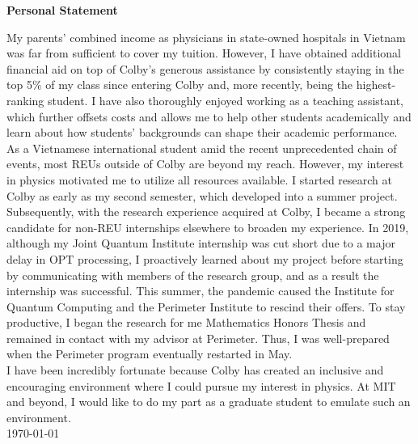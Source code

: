 \documentclass[12pt]{article}
\begin{document}
\begin{center}
	\textbf{Personal Statement}
\end{center}
My parents' combined income as physicians in state-owned hospitals in Vietnam was far from sufficient to cover my tuition. However,  I have obtained additional financial aid on top of Colby's generous assistance by consistently staying in the top 5\% of my class since entering Colby and, more recently, being the highest-ranking student. I have also thoroughly enjoyed working as a teaching assistant, which further offsets costs and allows me to help other students academically and learn about how students' backgrounds can shape their academic performance. \\

As a Vietnamese international student amid the recent unprecedented chain of events, most REUs outside of Colby are beyond my reach. However, my interest in physics motivated me to utilize all resources available. I started research at Colby as early as my second semester, which developed into a summer project. Subsequently, with the research experience acquired at Colby, I became a strong candidate for non-REU internships elsewhere to broaden my experience. In 2019, although my Joint Quantum Institute internship was cut short due to a major delay in OPT processing, I proactively learned about my project before starting by communicating with members of the research group, and as a result the internship was successful. This summer, the pandemic caused the Institute for Quantum Computing and the Perimeter Institute to rescind their offers. To stay productive, I began the research for me Mathematics Honors Thesis and remained in contact with my advisor at Perimeter. Thus, I was well-prepared when the Perimeter program eventually restarted in May.\\

I have been incredibly fortunate because Colby has created an inclusive and encouraging environment where I could pursue my interest in physics. At MIT and beyond, I would like to do my part as a graduate student to emulate such an environment.\\

\noindent \today
\end{document}
